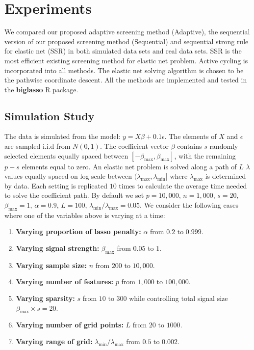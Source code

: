 \section{Experiments}

We compared our proposed adaptive screening method (Adaptive), the sequential version of our proposed screening method (Sequential) and sequential strong rule for elastic net (SSR) in both simulated data sets and real data sets. SSR is the most efficient existing screening method for elastic net problem. Active cycling is incorporated into all methods. The elastic net solving algorithm is chosen to be the pathwise coordinate descent. All the methods are implemented and tested in the \textbf{biglasso} R package.

\subsection{Simulation Study}



The data is simulated from the model: $y=X\beta+0.1\epsilon$. The elements of $X$ and $\epsilon$ are sampled i.i.d from $N(0,1)$. The coefficient vector $\beta$ contains $s$ randomly selected elements equally spaced between $[-\beta_{\max},\beta_{\max}]$, with the remaining $p-s$ elements equal to zero. An elastic net problem is solved along a path of $L$ $\lambda$ values equally spaced on log scale between $(\lambda_{\max},\lambda_{\min}]$ where $\lambda_{\max}$ is determined by data. Each setting is replicated $10$ times to calculate the average time needed to solve the coefficient path. By default we set $p=10,000$, $n=1,000$, $s=20$, $\beta_{\max}=1$, $\alpha=0.9$, $L=100$, $\lambda_{\min}/\lambda_{\max}=0.05$. We consider the following cases where one of the variables above is varying at a time:

\begin{enumerate}
    \item \textbf{Varying proportion of lasso penalty:} $\alpha$ from $0.2$ to $0.999$.
    \item \textbf{Varying signal strength:} $\beta_{\max}$ from $0.05$ to $1$.
    \item \textbf{Varying sample size:} $n$ from $200$ to $10,000$.
    \item \textbf{Varying number of features:} $p$ from $1,000$ to $100,000$.
    \item \textbf{Varying sparsity:} $s$ from $10$ to $300$ while controlling total signal size $\beta_{\max}\times s=20$.
    \item \textbf{Varying number of grid points:}  $L$ from $20$ to $1000$.
    \item \textbf{Varying range of grid:}  $\lambda_{\min}/\lambda_{\max}$ from $0.5$ to $0.002$.
\end{enumerate}

